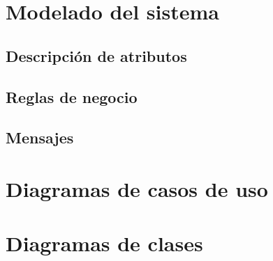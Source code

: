 \section{Modelado del sistema}

\subsection{Descripción de atributos}

\subsection{Reglas de negocio}

\subsection{Mensajes}

\section{Diagramas de casos de uso}



\newpage
\section{Diagramas de clases}


